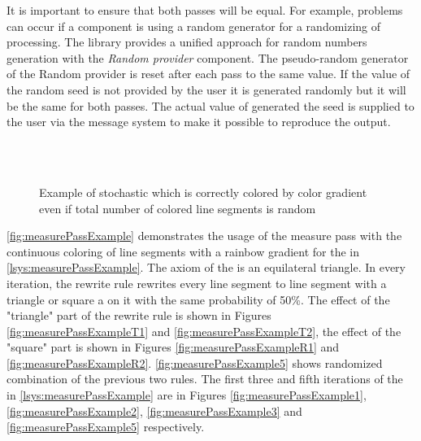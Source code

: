 It is important to ensure that both passes will be equal.
For example, problems can occur if a component is using a random generator for a randomizing of processing.
The library provides a unified approach for random numbers generation with the \emph{Random provider} component.
The pseudo-random generator of the Random provider is reset after each pass to the same value.
If the value of the random seed is not provided by the user it is generated randomly but it will be the same for both passes.
The actual value of generated the seed is supplied to the user via the message system to make it possible to reproduce the output.

\begin{figure}[p]
	\centering
	 ~
	 ~
	 ~
	\\
	 ~
	 ~
	\\
	\caption[Correctly colored stochastic \lsystem]{Example of stochastic \lsystem which is correctly colored by color gradient even if total number of colored line segments is random}
	\label{fig:measurePassExample}
\end{figure}

\autoref{fig:measurePassExample} demonstrates the usage of the measure pass with the continuous coloring of line segments with a rainbow gradient for the \lsystem in \autoref{lsys:measurePassExample}.
The axiom of the \lsystem is an equilateral triangle.
In every iteration, the rewrite rule rewrites every line segment to line segment with a triangle or square a on it with the same probability of 50\%.
The effect of the "triangle" part of the rewrite rule is shown in Figures \ref{fig:measurePassExampleT1} and \ref{fig:measurePassExampleT2},
	the effect of the "square" part is shown in Figures \ref{fig:measurePassExampleR1} and \ref{fig:measurePassExampleR2}.
\autoref{fig:measurePassExample5} shows randomized combination of the previous two rules.
The first three and fifth iterations of the \lsystem in \autoref{lsys:measurePassExample} are in Figures \ref{fig:measurePassExample1}, \ref{fig:measurePassExample2}, \ref{fig:measurePassExample3} and \ref{fig:measurePassExample5} respectively.

